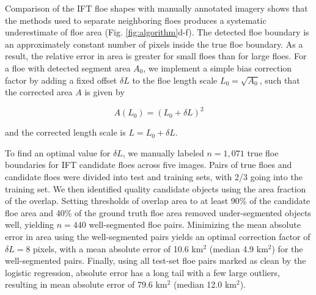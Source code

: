 \documentclass[review, jog]{igs}
\begin{document}
Comparison of the IFT floe shapes with manually annotated imagery shows that the methods used to separate neighboring floes produces a systematic underestimate of floe area (Fig. \ref{fig:algorithm}d-f). The detected floe boundary is an approximately constant number of pixels inside the true floe boundary. As a result, the relative error in area is greater for small floes than for large floes. For a floe with detected segment area $A_0$, we implement a simple bias correction factor by adding a fixed offset $\delta L$ to the floe length scale $L_0 = \sqrt{A_0}$, such that the corrected area $A$ is given by
\begin{linenomath*}
\begin{equation}
    A(L_0) = (L_0 + \delta L)^2 \label{eqn:area_adj}
\end{equation}
\end{linenomath*}
and the corrected length scale is $L = L_0 + \delta L$.

To find an optimal value for $\delta L$, we manually labeled $n=1,071$ true floe boundaries for IFT candidate floes across five images. Pairs of true floes and candidate floes were divided into test and training sets, with 2/3 going into the training set. We then identified quality candidate objects using the area fraction of the overlap. Setting thresholds of overlap area to at least 90\% of the candidate floe area and 40\% of the ground truth floe area removed under-segmented objects well, yielding $n=440$ well-segmented floe pairs. Minimizing the mean absolute error in area using the well-segmented pairs yields an optimal correction factor of $\delta L = 8$ pixels, with a mean absolute error of 10.6 km$^2$ (median 4.9 km$^2$) for the well-segmented pairs. Finally, using all test-set floe pairs marked as clean by the logistic regression, absolute error has a long tail with a few large outliers, resulting in mean absolute error of 79.6 km$^2$ (median 12.0 km$^2$).
\end{document}
